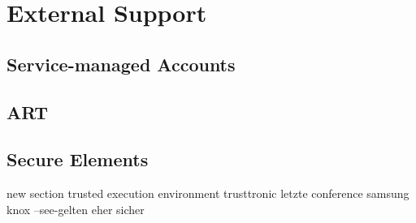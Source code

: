 \section{External Support} \label{section:evaluation-external}







\subsection{Service-managed Accounts}
\subsection{ART}
\subsection{Secure Elements}










new section trusted execution environment
trusttronic letzte conference
samsung knox
--see-gelten eher sicher
